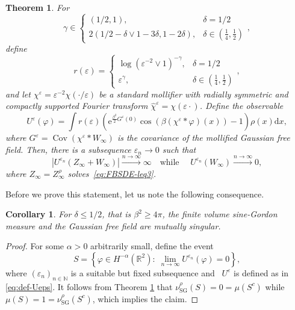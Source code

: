 \documentclass[11pt, a4paper]{scrartcl}
\numberwithin{equation}{section}
\theoremstyle{plain}
\newtheorem{theorem}[foo]{Theorem}
\newtheorem{corollary}[foo]{Corollary}
\theoremstyle{remark}
\newcommand{\mathd}{\mathrm{d}}
\newcommand{\mathe}{\mathrm{e}}
\newcommand{\tmop}[1]{\ensuremath{\operatorname{#1}}}
\begin{document}
\begin{theorem}
  \label{thm:Ueps-div}For
  \[\gamma \in \begin{cases}
    (1 / 2, 1), & \delta = 1 / 2\\
    2 (1 / 2 - \delta \vee 1 - 3 \delta, 1 - 2 \delta), & \delta \in(\frac{1}{4},\frac{1}{2})
  \end{cases},\]
  define
  \[ r (\varepsilon) = \begin{cases}
       \log (\varepsilon^{- 2} \vee 1)^{- \gamma}, & \text{$\delta = 1 / 2$
       }\\
       {\varepsilon^{\gamma}} , \, & \text{$\delta \in(\frac{1}{4},\frac{1}{2})$}
     \end{cases},\]
  and let $\chi^{\varepsilon} = \varepsilon^{- 2} \chi (\cdot / \varepsilon)$
  be a standard mollifier with radially symmetric and compactly supported
  Fourier transform $\hat{\chi}^{\varepsilon} = \chi (\varepsilon \cdot)$.
  Define the observable
  \begin{equation}
    U^{\varepsilon} (\varphi) = \int r (\varepsilon) \left(
    \mathe^{\frac{\beta^2}{2} G^{\varepsilon} (0)} \cos (\beta
    (\chi^{\varepsilon} \ast \varphi) (x)) - 1 \right) \rho (x) \mathd x,
    \label{eq:def-Ueps}
  \end{equation}
  where $G^{\varepsilon} = \tmop{Cov} (\chi^{\varepsilon} \ast W_{\infty})$ is
  the covariance of the mollified Gaussian free field. Then, there is a
  subsequence $\varepsilon_n \rightarrow 0$ such that
  \begin{equation}
    | U^{\varepsilon_n} (Z_{\infty} + W_{\infty}) | \overset{n \rightarrow
    \infty}{\longrightarrow} \infty \quad \text{while } \quad
    U^{\varepsilon_n} (W_{\infty}) \overset{n \rightarrow
    \infty}{\longrightarrow} 0, \label{eq:Ueps-div}
  \end{equation}
  where $Z_{\infty} = Z_{\infty}^{\rho}$ solves~\eqref{eq:FBSDE-leq3}.
\end{theorem}
Before we prove this statement, let us note the following consequence.

\begin{corollary}
  For $\delta \leqslant 1 / 2$, that is $\beta^2 \geqslant 4 \pi$, the finite
  volume sine-Gordon measure and the Gaussian free field are mutually
  singular.
\end{corollary}

\begin{proof}
  For some $\alpha > 0$ arbitrarily small, define the event
  \[ S = \left\{ \varphi \in H^{- \alpha} (\mathbb{R}^2) : \; \lim_{n
     \rightarrow \infty} U^{\varepsilon_n} (\varphi) = 0 \right\}, \]
  where $(\varepsilon_n)_{n \in \mathbb{N}}$ is a suitable but fixed subsequence and \
  $U^{\varepsilon}$ is defined as in \eqref{eq:def-Ueps}. It follows from
  Theorem \ref{thm:Ueps-div} that $\nu_{\tmop{SG}}^{\rho} (S) = 0 = \mu(S^c)$ while
  $\mu (S) = 1 = \nu_{\tmop{SG}}^{\rho} (S^c)$, which implies the claim.
\end{proof}
\end{document}
